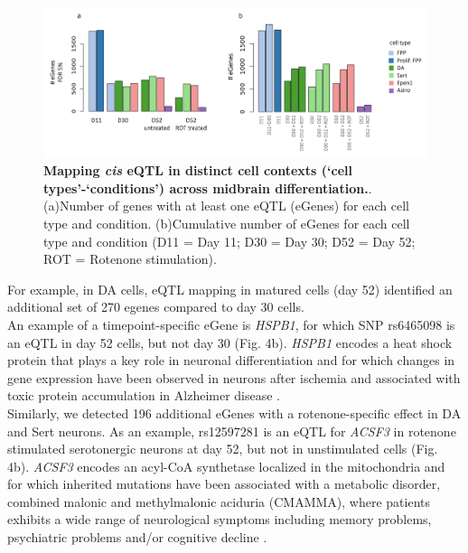 \begin{figure}[h]
\centering
\includegraphics[width=16cm]{Chapter5/Fig/neuroseq_eqtl.png}
\caption[Mapping eQTL across neuronal cell types]{\textbf{Mapping \textit{cis} eQTL in distinct cell contexts (`cell types'-`conditions') across midbrain differentiation.}.\\
(a)Number of genes with at least one eQTL (eGenes) for each cell type and condition.
(b)Cumulative number of eGenes for each cell type and condition (D11 = Day 11; D30 = Day 30; D52 = Day 52; ROT = Rotenone stimulation).}
\label{fig:neuroseq_eqtl}
\end{figure}

For example, in DA cells, eQTL mapping in matured cells (day 52) identified an additional set of 270 egenes compared to day 30 cells.\\

An example of a timepoint-specific eGene is \textit{HSPB1}, for which SNP rs6465098 is an eQTL in day 52 cells, but not day 30 (Fig. 4b). 
\textit{HSPB1} encodes a heat shock protein that plays a key role in neuronal differentiation \cite{miller2018heat} and for which changes in gene expression have been observed in neurons after ischemia \cite{bartelt2016hspb5} and associated with toxic protein accumulation in Alzheimer disease \cite{shimura2004binding, wilhelmus2006small}.\\

Similarly, we detected 196 additional eGenes with a rotenone-specific effect in DA and Sert neurons. 
As an example, rs12597281 is an eQTL for \textit{ACSF3} in rotenone stimulated serotonergic neurons at day 52, but not in unstimulated cells (Fig. 4b). 
\textit{ACSF3} encodes an acyl-CoA synthetase localized in the mitochondria and for which inherited mutations have been associated with a metabolic disorder, combined malonic and methylmalonic aciduria (CMAMMA), where patients exhibits a wide range of neurological symptoms including memory problems, psychiatric problems and/or cognitive decline \cite{tucci2020brain}.\\

